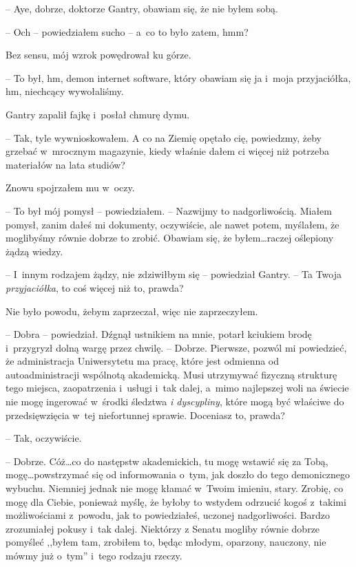 \documentclass[oneside,polish,11pt,sfheadings]{mwbk}
\begin{document}
-- Aye, dobrze, doktorze Gantry, obawiam się,
że nie byłem sobą.

-- Och -- powiedziałem sucho -- a~co to było zatem, hmm?

Bez sensu, mój wzrok powędrował ku górze. 

-- To był, hm, demon internet
software, który obawiam się ja i~moja przyjaciółka, hm, niechcący
wywołaliśmy.

Gantry zapalił fajkę i~posłał chmurę dymu.

-- Tak, tyle wywnioskowałem. A co na Ziemię opętało cię, powiedzmy, żeby
grzebać w~mrocznym magazynie, kiedy właśnie dałem ci więcej niż potrzeba
materiałów na lata studiów?

Znowu spojrzałem mu w~oczy. 

-- To był mój pomysł -- powiedziałem. -- Nazwijmy to nadgorliwością. Miałem pomysł, zanim dałeś mi dokumenty,
oczywiście, ale nawet potem, myślałem, że moglibyśmy równie dobrze to
zrobić. Obawiam się, że byłem\ldots raczej oślepiony żądzą wiedzy.

-- I~innym rodzajem żądzy, nie zdziwiłbym się -- powiedział Gantry. -- Ta
Twoja \textit{przyjaciółka}, to coś więcej niż to, prawda?

Nie było powodu, żebym zaprzeczał, więc nie zaprzeczyłem.

-- Dobra -- powiedział. Dźgnął ustnikiem na mnie, potarł kciukiem brodę i~przygryzł dolną wargę przez chwilę. -- Dobrze. Pierwsze, pozwól mi
powiedzieć, że administracja Uniwersytetu ma pracę, które jest odmienna
od autoadministracji wspólnotą akademicką. Musi utrzymywać fizyczną
strukturę tego miejsca, zaopatrzenia i~usługi i~tak dalej, a~mimo
najlepszej woli na świecie nie mogę ingerować w~środki śledztwa \textit{i
dyscypliny}, które mogą być właściwe do przedsięwzięcia w~tej
niefortunnej sprawie. Doceniasz to, prawda?

-- Tak, oczywiście.

-- Dobrze. Cóż\ldots co do następstw akademickich, tu mogę wstawić się za
Tobą, mogę\ldots powstrzymać się od informowania o~tym, jak doszło do tego
demonicznego wybuchu. Niemniej jednak nie mogę kłamać w~Twoim imieniu,
stary. Zrobię, co mogę dla Ciebie, ponieważ myślę, że byłoby to wstydem
odrzucić kogoś z~takimi możliwościami z~powodu, jak to powiedziałeś,
uczonej nadgorliwości. Bardzo zrozumiałej pokusy i~tak dalej. Niektórzy
z Senatu mogliby równie dobrze pomyśleć ,,byłem tam, zrobiłem to, będąc
młodym, oparzony, nauczony, nie mówmy już o~tym'' i~tego rodzaju rzeczy.
\end{document}
